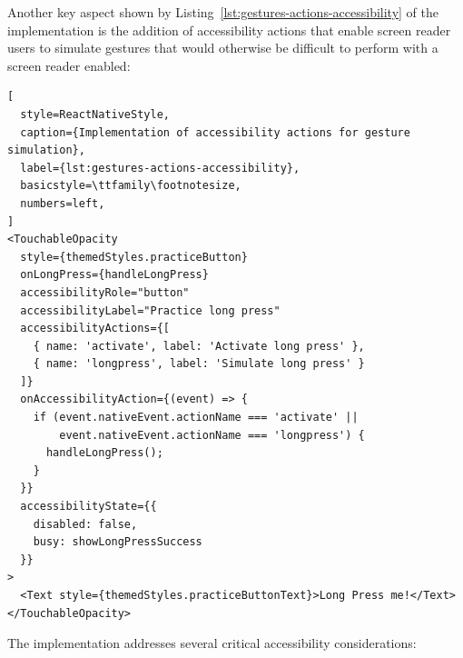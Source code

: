 Another key aspect shown by Listing~\ref{lst:gestures-actions-accessibility} of the implementation is the addition of accessibility actions that enable screen reader users to simulate gestures that would otherwise be difficult to perform with a screen reader enabled:

\begin{lstlisting}[
  style=ReactNativeStyle,
  caption={Implementation of accessibility actions for gesture simulation},
  label={lst:gestures-actions-accessibility},
  basicstyle=\ttfamily\footnotesize,
  numbers=left,
]
<TouchableOpacity
  style={themedStyles.practiceButton}
  onLongPress={handleLongPress}
  accessibilityRole="button"
  accessibilityLabel="Practice long press"
  accessibilityActions={[
    { name: 'activate', label: 'Activate long press' },
    { name: 'longpress', label: 'Simulate long press' }
  ]}
  onAccessibilityAction={(event) => {
    if (event.nativeEvent.actionName === 'activate' ||
        event.nativeEvent.actionName === 'longpress') {
      handleLongPress();
    }
  }}
  accessibilityState={{
    disabled: false,
    busy: showLongPressSuccess
  }}
>
  <Text style={themedStyles.practiceButtonText}>Long Press me!</Text>
</TouchableOpacity>
\end{lstlisting}
\FloatBarrier

The implementation addresses several critical accessibility considerations:

